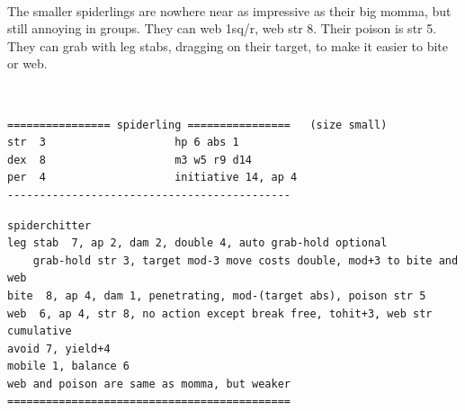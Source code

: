 \

\goodbreak 
\noindent The smaller spiderlings are nowhere near as impressive as their big momma, but still annoying in groups. They can web 1sq/r, web str 8. Their poison is str 5. They can grab with leg stabs, dragging on their target, to make it easier to bite or web.

\

\small \begin{samepage} \begin{verbatim}
================ spiderling ================   (size small)
str  3                    hp 6 abs 1
dex  8                    m3 w5 r9 d14
per  4                    initiative 14, ap 4
--------------------------------------------
\end{verbatim} \goodbreak \begin{verbatim}
spiderchitter
leg stab  7, ap 2, dam 2, double 4, auto grab-hold optional
    grab-hold str 3, target mod-3 move costs double, mod+3 to bite and web
bite  8, ap 4, dam 1, penetrating, mod-(target abs), poison str 5
web  6, ap 4, str 8, no action except break free, tohit+3, web str cumulative
avoid 7, yield+4
mobile 1, balance 6
web and poison are same as momma, but weaker
============================================
\end{verbatim} \end{samepage} \normalsize


































